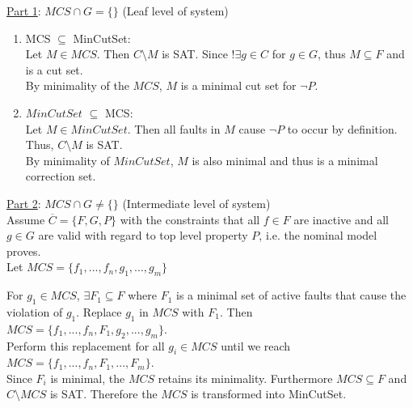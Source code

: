 \underline{Part 1}: $MCS \cap G = \{\}$ (Leaf level of system)\\
\begin{enumerate}[label=(\roman*)]

\item MCS $\subseteq$ MinCutSet: \\

Let $M \in  MCS$. Then $C\setminus M$ is SAT. Since $!\exists g \in C$ for $g \in G$, thus $M \subseteq F$ and is a cut set.  \\

By minimality of the $MCS$, $M$ is a minimal cut set for $ \neg P $.  \\

\item $MinCutSet $ $\subseteq$ MCS: \\

Let $M \in MinCutSet$. Then all faults in $M$ cause $ \neg P $ to occur by definition. Thus, $C\setminus M$ is SAT.  \\

By minimality of $MinCutSet$, $M$ is also minimal and thus is a minimal correction set.\\

\end{enumerate}

\underline{Part 2}: $MCS \cap G \neq \{\}$ (Intermediate level of system)\\

Assume $\overline{C} = \{F,G,P\}$ with the constraints that all $f \in F$ are inactive and all $g\in G$ are valid with regard to top level property $P$, i.e. the nominal model proves. \\

Let $MCS = \{f_1,...,f_n,g_1,...,g_m\}$

For $g_1 \in MCS$, $\exists F_1 \subseteq F$ where $F_1$ is a minimal set of active faults that cause the violation of $g_1$.  Replace $g_1$ in $MCS$ with $F_1$. Then $MCS = \{f_1,...,f_n, F_1,g_2,...,g_m\}$. \\

Perform this replacement for all $g_i \in MCS$ until we reach $MCS = \{f_1,...,f_n,F_1,...,F_m\}$. \\

Since $F_i$ is minimal, the $MCS$ retains its minimality. Furthermore $MCS \subseteq F$ and $C\setminus MCS$ is SAT. Therefore the $MCS$ is transformed into MinCutSet. 







































